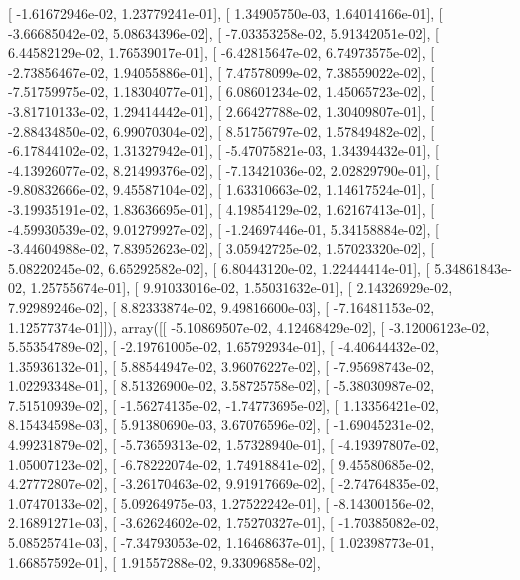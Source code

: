 \documentclass{article}
\begin{document}
       [ -1.61672946e-02,   1.23779241e-01],
       [  1.34905750e-03,   1.64014166e-01],
       [ -3.66685042e-02,   5.08634396e-02],
       [ -7.03353258e-02,   5.91342051e-02],
       [  6.44582129e-02,   1.76539017e-01],
       [ -6.42815647e-02,   6.74973575e-02],
       [ -2.73856467e-02,   1.94055886e-01],
       [  7.47578099e-02,   7.38559022e-02],
       [ -7.51759975e-02,   1.18304077e-01],
       [  6.08601234e-02,   1.45065723e-02],
       [ -3.81710133e-02,   1.29414442e-01],
       [  2.66427788e-02,   1.30409807e-01],
       [ -2.88434850e-02,   6.99070304e-02],
       [  8.51756797e-02,   1.57849482e-02],
       [ -6.17844102e-02,   1.31327942e-01],
       [ -5.47075821e-03,   1.34394432e-01],
       [ -4.13926077e-02,   8.21499376e-02],
       [ -7.13421036e-02,   2.02829790e-01],
       [ -9.80832666e-02,   9.45587104e-02],
       [  1.63310663e-02,   1.14617524e-01],
       [ -3.19935191e-02,   1.83636695e-01],
       [  4.19854129e-02,   1.62167413e-01],
       [ -4.59930539e-02,   9.01279927e-02],
       [ -1.24697446e-01,   5.34158884e-02],
       [ -3.44604988e-02,   7.83952623e-02],
       [  3.05942725e-02,   1.57023320e-02],
       [  5.08220245e-02,   6.65292582e-02],
       [  6.80443120e-02,   1.22444414e-01],
       [  5.34861843e-02,   1.25755674e-01],
       [  9.91033016e-02,   1.55031632e-01],
       [  2.14326929e-02,   7.92989246e-02],
       [  8.82333874e-02,   9.49816600e-03],
       [ -7.16481153e-02,   1.12577374e-01]]), array([[ -5.10869507e-02,   4.12468429e-02],
       [ -3.12006123e-02,   5.55354789e-02],
       [ -2.19761005e-02,   1.65792934e-01],
       [ -4.40644432e-02,   1.35936132e-01],
       [  5.88544947e-02,   3.96076227e-02],
       [ -7.95698743e-02,   1.02293348e-01],
       [  8.51326900e-02,   3.58725758e-02],
       [ -5.38030987e-02,   7.51510939e-02],
       [ -1.56274135e-02,  -1.74773695e-02],
       [  1.13356421e-02,   8.15434598e-03],
       [  5.91380690e-03,   3.67076596e-02],
       [ -1.69045231e-02,   4.99231879e-02],
       [ -5.73659313e-02,   1.57328940e-01],
       [ -4.19397807e-02,   1.05007123e-02],
       [ -6.78222074e-02,   1.74918841e-02],
       [  9.45580685e-02,   4.27772807e-02],
       [ -3.26170463e-02,   9.91917669e-02],
       [ -2.74764835e-02,   1.07470133e-02],
       [  5.09264975e-03,   1.27522242e-01],
       [ -8.14300156e-02,   2.16891271e-03],
       [ -3.62624602e-02,   1.75270327e-01],
       [ -1.70385082e-02,   5.08525741e-03],
       [ -7.34793053e-02,   1.16468637e-01],
       [  1.02398773e-01,   1.66857592e-01],
       [  1.91557288e-02,   9.33096858e-02],
\end{document}
